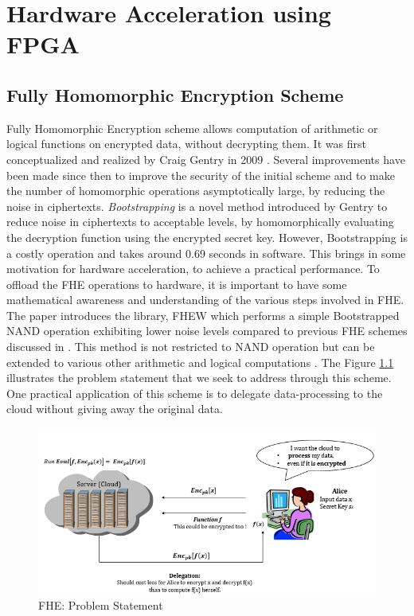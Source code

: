 \chapter{Hardware Acceleration using FPGA}
\label{ch4_fhew}

\section{Fully Homomorphic Encryption Scheme}
\label{4_1}
Fully Homomorphic Encryption scheme allows computation of arithmetic or logical functions on encrypted data, without decrypting them. It was first conceptualized and realized by Craig Gentry in 2009 \cite{gentry2010computing}.  Several improvements have been made since then to improve the security of the initial scheme \cite{gentry2011implementing}\cite{gentry2012homomorphic}\cite{halevi2014algorithms} and to make the number of homomorphic operations asymptotically large, by reducing the noise in ciphertexts. \textit{Bootstrapping} is a novel method introduced by Gentry to reduce noise in ciphertexts to acceptable levels, by homomorphically evaluating the decryption function using the encrypted secret key. However, Bootstrapping is a costly operation \cite{ducas2015fhew} and takes around 0.69 seconds in software. This brings in some motivation for hardware acceleration, to achieve a practical performance.\newline\newline
To offload the FHE operations to hardware, it is important to have some mathematical awareness and understanding of the various steps involved in FHE. The paper \cite{ducas2015fhew} introduces the library, FHEW \cite{fhew_lib} which performs a simple Bootstrapped NAND operation exhibiting lower noise levels compared to previous FHE schemes discussed in \cite{halevi2014algorithms}\cite{gentry2012homomorphic}. This method is not restricted to NAND operation but can be extended to various other arithmetic and logical computations \cite{ducas2015fhew}. \newline
The Figure \ref{fig:fhew_prob_stmt} illustrates the problem statement that we seek to address through this scheme. One practical application of this scheme is to delegate data-processing to the cloud without giving away the original data. 
\begin{figure}[h!]
 \centering
 \includegraphics[width=\linewidth]{figures/fhew_prob_stmt.PNG}
 \caption{FHE: Problem Statement
 \cite{shai_he}}
 \label{fig:fhew_prob_stmt}
\end{figure}
